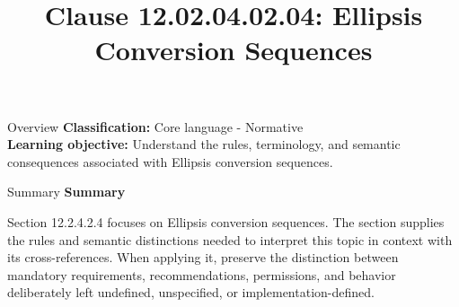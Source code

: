 \documentclass[10pt,letterpaper]{article}
\title{Clause 12.02.04.02.04: Ellipsis Conversion Sequences}
\author{}
\date{}
\begin{document}
\maketitle
\begin{CornellOverviewBox}{Overview}
\textbf{Classification:} Core language - Normative\\[2pt]
\textbf{Learning objective:} Understand the rules, terminology, and semantic consequences associated with Ellipsis conversion sequences.
\end{CornellOverviewBox}\begin{CornellSummaryBox}{Summary}
{\sffamily\bfseries\color{Accent} Summary}\par\vspace{3pt}Section 12.2.4.2.4 focuses on Ellipsis conversion sequences. The section supplies the rules and semantic distinctions needed to interpret this topic in context with its cross-references. When applying it, preserve the distinction between mandatory requirements, recommendations, permissions, and behavior deliberately left undefined, unspecified, or implementation-defined.
\end{CornellSummaryBox}
\end{document}
